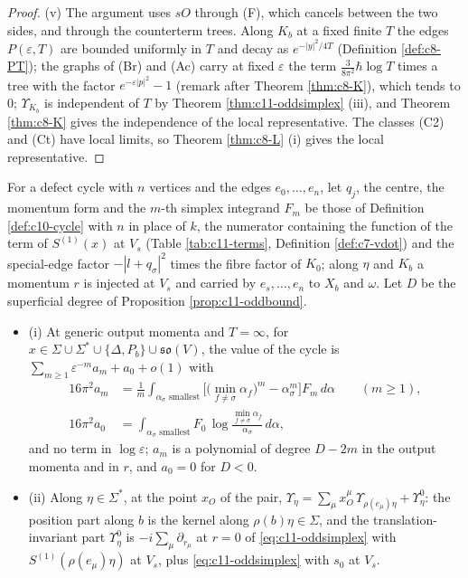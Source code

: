\begin{proof}
(v) The argument uses $sO$ through (F), which cancels between the two sides, and through the counterterm trees. Along $K_b$ at a fixed finite $T$ the edges $P(\varepsilon,T)$ are bounded uniformly in $T$ and decay as $e^{-|y|^2/4T}$ (Definition \ref{def:c8-PT}); the graphs of (Br) and (Ac) carry at fixed $\varepsilon$ the term $\tfrac{3}{8\pi^2}\hbar\log T$ times a tree with the factor $e^{-\varepsilon|p|^2}-1$ (remark after Theorem \ref{thm:c8-K}), which tends to $0$; $\Upsilon_{K_b}$ is independent of $T$ by Theorem \ref{thm:c11-oddsimplex} (iii), and Theorem \ref{thm:c8-K} gives the independence of the local representative. The classes (C2) and (Ct) have local limits, so Theorem \ref{thm:c8-L} (i) gives the local representative.
\end{proof}

\begin{theorem}
\label{thm:c11-oddsimplex}
For a defect cycle with $n$ vertices and the edges $e_0,\dots,e_n$, let $q_j$, the centre, the momentum form and the $m$-th simplex integrand $F_m$ be those of Definition \ref{def:c10-cycle} with $n$ in place of $k$, the numerator containing the function of the term of $S^{(1)}(x)$ at $V_s$ (Table \ref{tab:c11-terms}, Definition \ref{def:c7-vdot}) and the special-edge factor $-|l+q_\sigma|^2$ times the fibre factor of $K_0$; along $\eta$ and $K_b$ a momentum $r$ is injected at $V_s$ and carried by $e_s,\dots,e_n$ to $X_b$ and $\omega$. Let $D$ be the superficial degree of Proposition \ref{prop:c11-oddbound}.
\begin{itemize}
\item (i) At generic output momenta and $T=\infty$, for $x\in\Sigma\cup\Sigma^*\cup\{\Delta,P_b\}\cup\mathfrak{so}(V)$, the value of the cycle is $\sum_{m\ge1}\varepsilon^{-m}a_m+a_0+o(1)$ with
\begin{equation}
\begin{aligned}
16\pi^2a_m&=\frac1m\int_{\alpha_\sigma\text{ smallest}}\Big[\big(\min_{f\ne\sigma}\alpha_f\big)^m-\alpha_\sigma^m\Big]F_m\,d\alpha\qquad(m\ge1),\\
16\pi^2a_0&=\int_{\alpha_\sigma\text{ smallest}}F_0\,\log\frac{\min_{f\ne\sigma}\alpha_f}{\alpha_\sigma}\,d\alpha,
\end{aligned}
\label{eq:c11-oddsimplex}
\end{equation}
and no term in $\log\varepsilon$; $a_m$ is a polynomial of degree $D-2m$ in the output momenta and in $r$, and $a_0=0$ for $D<0$.
\item (ii) Along $\eta\in\Sigma^*$, at the point $x_O$ of the pair, $\Upsilon_\eta=\sum_\mu x_O^\mu\,\Upsilon_{\rho(e_\mu)\eta}+\Upsilon^0_\eta$: the position part along $b$ is the kernel along $\rho(b)\eta\in\Sigma$, and the translation-invariant part $\Upsilon^0_\eta$ is $-i\sum_\mu\partial_{r_\mu}$ at $r=0$ of \eqref{eq:c11-oddsimplex} with $S^{(1)}(\rho(e_\mu)\eta)$ at $V_s$, plus \eqref{eq:c11-oddsimplex} with $s_0$ at $V_s$.

\end{itemize}
\end{theorem}
